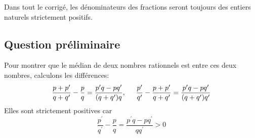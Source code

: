 Dans tout le corrigé, les d{\'e}nominateurs des fractions seront toujours des entiers naturels strictement positifs.
\subsection*{Question pr{\'e}liminaire}
Pour montrer que le m{\'e}dian de deux nombres rationnels est entre ces deux nombres, calculons les diff{\'e}rences:
\begin{displaymath}
\frac{p+p^{\prime }}{q+q^{\prime }}-\frac{p}{q} =\frac{p^{\prime}q-pq^{\prime }}{(q+q^{\prime })q},\hspace{0.5cm}
\frac{p^{\prime }}{q^{\prime}}-\frac{p+p^{\prime }}{q+q^{\prime }} =\frac{p^{\prime }q-pq^{\prime }}{(q+q^{\prime })q^{\prime }}
\end{displaymath}
Elles sont strictement positives car
\begin{displaymath}
 \frac{p^{\prime }}{q^{\prime }}-\frac{p}{q}=\frac{p^{\prime }q-pq^{\prime }}{qq^{\prime }}>0
\end{displaymath}

